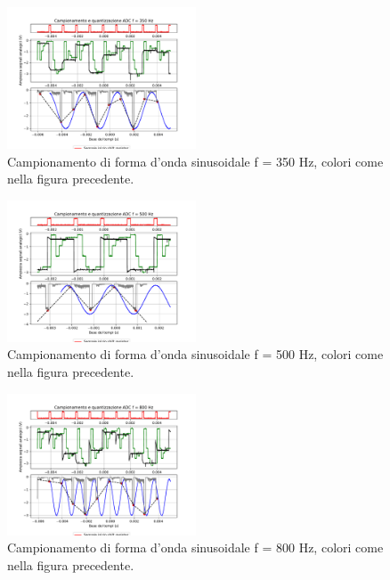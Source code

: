 \documentclass[journal]{IEEEtran}
\begin{document}
\vspace{-10mm}
%
\begin{figure}[H]%
\begin{center}
\includegraphics[trim={0 40 0 0}, clip,width=0.50\textwidth]{analysis/output/campionamento_350Hz.pdf}
\caption{Campionamento di forma d'onda sinusoidale f = 350 Hz, colori come nella figura precedente.}
\label{fig:graph_ring_oscillator}
\end{center}
\end{figure}
\vspace{-10mm}
%
\begin{figure}[H]%
\begin{center}
\includegraphics[trim={0 40 0 0}, clip,width=0.50\textwidth]{analysis/output/campionamento_500Hz.pdf}
\caption{Campionamento di forma d'onda sinusoidale f = 500 Hz, colori come nella figura precedente.}
\label{fig:graph_ring_oscillator}
\end{center}
\end{figure}
\vspace{-10mm}
%
\begin{figure}[H]%
\begin{center}
\includegraphics[trim={0 40 0 0}, clip,width=0.50\textwidth]{analysis/output/campionamento_800Hz.pdf}
\caption{Campionamento di forma d'onda sinusoidale f = 800 Hz, colori come nella figura precedente.}
\label{fig:graph_ring_oscillator}
\end{center}
\end{figure}
\end{document}
